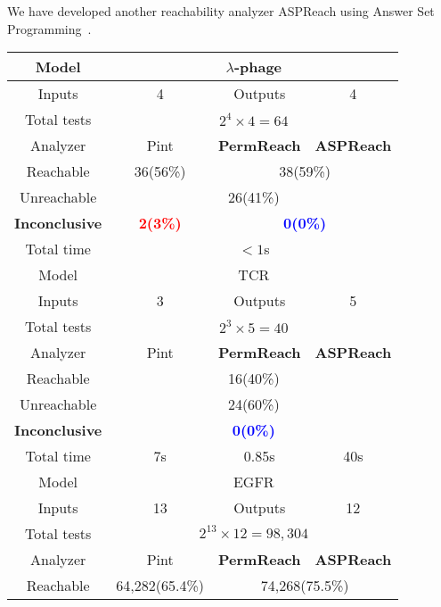 \documentclass{article}
\theoremstyle{definition}
\begin{document}
We have developed another reachability analyzer ASPReach using Answer Set Programming~\cite{chai2018reach}.

\begin{table}[ht]
\centering
    \begin{tabular}{|c|c|c|c|}
    \hline
     Model    &  \multicolumn{3}{c|}{$\lambda$-phage}\\
     \hline
     Inputs    & 4 & Outputs& 4\\%
     \hline
     Total tests&\multicolumn{3}{c|}{$2^4\times 4=64$}\\
     \hline
     Analyzer  &  Pint  &  \textbf{PermReach}   &\textbf{ASPReach}\\
     \hline
     Reachable & 36(56\%)& \multicolumn{2}{c|}{38(59\%)} \\
     \hline
     Unreachable&\multicolumn{3}{c|}{26(41\%)}\\
     \hline
     \textbf{Inconclusive} &\textcolor{red}{\textbf{2(3\%)}}&\multicolumn{2}{c|}{\textcolor{blue}{\textbf{0(0\%)}}}\\
     \hline
     Total time & \multicolumn{3}{c|}{$<1$s}\\
    \hline
     Model    &  \multicolumn{3}{c|}{TCR}\\
     \hline
     Inputs    & 3 & Outputs& 5\\
     \hline
     Total tests&\multicolumn{3}{c|}{$2^3\times 5=40$}\\
     \hline
     Analyzer  &  Pint  &  \textbf{PermReach}   &\textbf{ASPReach}\\
     \hline
     Reachable & \multicolumn{3}{c|}{16(40\%)} \\
     \hline
     Unreachable&\multicolumn{3}{c|}{24(60\%)} \\
     \hline
     \textbf{Inconclusive} &\multicolumn{3}{c|}{\textcolor{blue}{\textbf{0(0\%)}}} \\
     \hline
     Total time &  7s     &0.85s  &  40s        \\
    \hline
     Model    &  \multicolumn{3}{c|}{EGFR}\\
     \hline
     Inputs    & 13 & Outputs& 12\\
     \hline
     Total tests&\multicolumn{3}{c|}{$2^{13}\times 12=98,304$}\\
     \hline
     Analyzer  &  Pint  &  \textbf{PermReach}   &\textbf{ASPReach}\\
     \hline
     Reachable & 64,282(65.4\%)  & \multicolumn{2}{c|}{74,268(75.5\%)} \\

\end{tabular}
\end{table}
\end{document}
